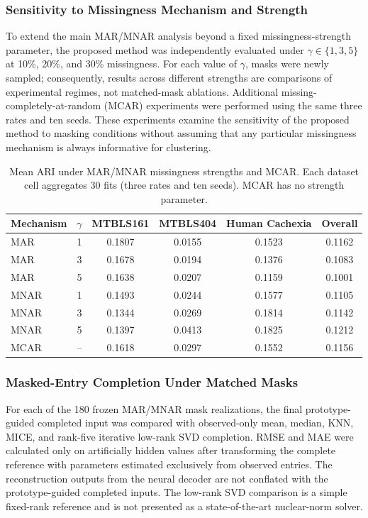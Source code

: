 \subsubsection{Sensitivity to Missingness Mechanism and Strength}
To extend the main MAR/MNAR analysis beyond a fixed missingness-strength parameter, the proposed method was independently evaluated under $\gamma\in\{1,3,5\}$ at 10\%, 20\%, and 30\% missingness. For each value of $\gamma$, masks were newly sampled; consequently, results across different strengths are comparisons of experimental regimes, not matched-mask ablations. Additional missing-completely-at-random (MCAR) experiments were performed using the same three rates and ten seeds. These experiments examine the sensitivity of the proposed method to masking conditions without assuming that any particular missingness mechanism is always informative for clustering.

\begin{table}[t]
\centering
\caption{Mean ARI under MAR/MNAR missingness strengths and MCAR. Each dataset cell aggregates 30 fits (three rates and ten seeds). MCAR has no strength parameter.}
\label{tab:pg_gamma_mcar}
\small
\begin{tabular}{lccccc}
\toprule
Mechanism & $\gamma$ & MTBLS161 & MTBLS404 & Human Cachexia & Overall \\
\midrule
MAR & 1 & 0.1807 & 0.0155 & 0.1523 & 0.1162\\
MAR & 3 & 0.1678 & 0.0194 & 0.1376 & 0.1083\\
MAR & 5 & 0.1638 & 0.0207 & 0.1159 & 0.1001\\
MNAR & 1 & 0.1493 & 0.0244 & 0.1577 & 0.1105\\
MNAR & 3 & 0.1344 & 0.0269 & 0.1814 & 0.1142\\
MNAR & 5 & 0.1397 & 0.0413 & 0.1825 & 0.1212\\
MCAR & -- & 0.1618 & 0.0297 & 0.1552 & 0.1156\\
\bottomrule
\end{tabular}
\end{table}

\subsubsection{Masked-Entry Completion Under Matched Masks}
For each of the 180 frozen MAR/MNAR mask realizations, the final prototype-guided completed input was compared with observed-only mean, median, KNN, MICE, and rank-five iterative low-rank SVD completion. RMSE and MAE were calculated only on artificially hidden values after transforming the complete reference with parameters estimated exclusively from observed entries. The reconstruction outputs from the neural decoder are not conflated with the prototype-guided completed inputs. The low-rank SVD comparison is a simple fixed-rank reference and is not presented as a state-of-the-art nuclear-norm solver.

